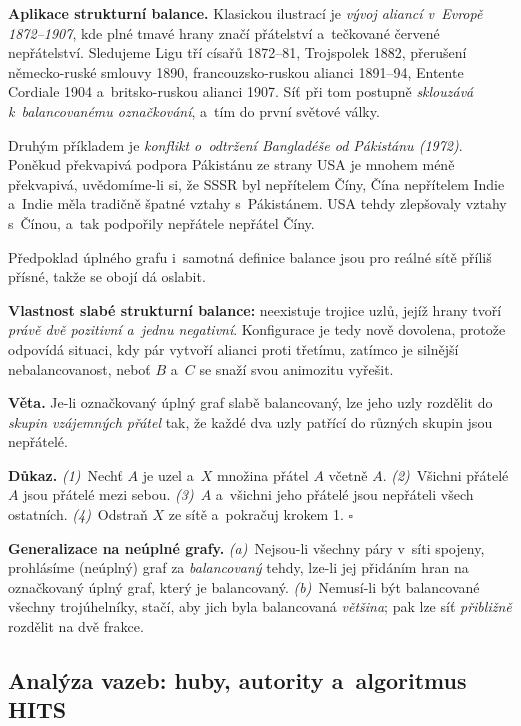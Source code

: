 \documentclass[11pt,a4paper]{article}
\theoremstyle{definition}
\begin{document}
\textbf{Aplikace strukturní balance.} Klasickou ilustrací je \emph{vývoj aliancí v~Evropě
1872--1907}, kde plné tmavé hrany značí přátelství a~tečkované červené nepřátelství. Sledujeme
Ligu tří císařů 1872--81, Trojspolek 1882, přerušení německo-ruské smlouvy 1890,
francouzsko-ruskou alianci 1891--94, Entente Cordiale 1904 a~britsko-ruskou alianci 1907. Síť
při tom postupně \emph{sklouzává k~balancovanému označkování}, a~tím do první světové války.

Druhým příkladem je \emph{konflikt o~odtržení Bangladéše od Pákistánu (1972)}. Poněkud
překvapivá podpora Pákistánu ze strany USA je mnohem méně překvapivá, uvědomíme-li si, že SSSR
byl nepřítelem Číny, Čína nepřítelem Indie a~Indie měla tradičně špatné vztahy s~Pákistánem.
USA tehdy zlepšovaly vztahy s~Čínou, a~tak podpořily nepřátele nepřátel Číny.

Předpoklad úplného grafu i~samotná definice balance jsou pro reálné sítě příliš přísné, takže
se obojí dá oslabit.

\begin{defbox}
\textbf{Vlastnost slabé strukturní balance:} neexistuje trojice uzlů, jejíž hrany tvoří
\emph{právě dvě pozitivní a~jednu negativní}. Konfigurace  je tedy nově
dovolena, protože odpovídá situaci, kdy pár vytvoří alianci proti třetímu, zatímco  je silnější nebalancovanost, neboť $B$ a~$C$ se snaží svou
animozitu vyřešit.

\textbf{Věta.} Je-li označkovaný úplný graf slabě balancovaný, lze jeho uzly rozdělit do
\emph{skupin vzájemných přátel} tak, že každé dva uzly patřící do různých skupin jsou
nepřátelé.

\textbf{Důkaz.} \emph{(1)}~Nechť $A$ je uzel a~$X$ množina přátel $A$ včetně $A$.
\emph{(2)}~Všichni přátelé $A$ jsou přátelé mezi sebou. \emph{(3)}~$A$ a~všichni jeho přátelé
jsou nepřáteli všech ostatních. \emph{(4)}~Odstraň $X$ ze sítě a~pokračuj krokem 1. $\square$

\textbf{Generalizace na neúplné grafy.} \emph{(a)}~Nejsou-li všechny páry v~síti spojeny,
prohlásíme (neúplný) graf za \emph{balancovaný} tehdy, lze-li jej  přidáním hran
na označkovaný úplný graf, který je balancovaný. \emph{(b)}~Nemusí-li být balancované všechny
trojúhelníky, stačí, aby jich byla balancovaná \emph{většina}; pak lze síť \emph{přibližně}
rozdělit na dvě frakce.
\end{defbox}

\subsection{Analýza vazeb: huby, autority a~algoritmus HITS}
\end{document}
